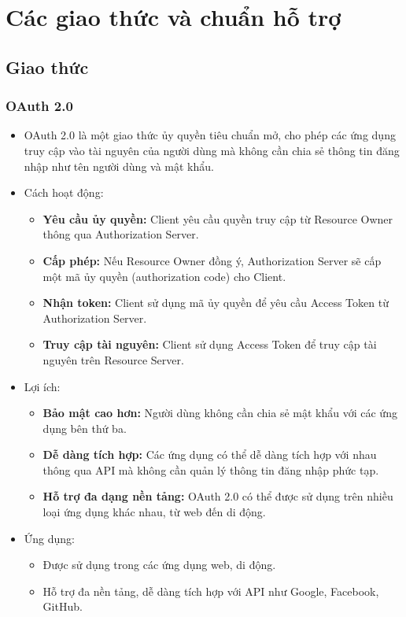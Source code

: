 \newpage
\section{Các giao thức và chuẩn hỗ trợ}
\subsection{Giao thức}
\subsubsection{OAuth 2.0}
\begin{itemize}
    \item OAuth 2.0 là một giao thức ủy quyền tiêu chuẩn mở, cho phép các ứng dụng truy cập vào tài nguyên của người dùng mà không cần chia sẻ thông tin đăng nhập như tên người dùng và mật khẩu.
    \item Cách hoạt động:
    \begin{itemize}
        \item \textbf{Yêu cầu ủy quyền:} Client yêu cầu quyền truy cập từ Resource Owner thông qua Authorization Server.
        \item \textbf{Cấp phép:} Nếu Resource Owner đồng ý, Authorization Server sẽ cấp một mã ủy quyền (authorization code) cho Client.
        \item \textbf{Nhận token:} Client sử dụng mã ủy quyền để yêu cầu Access Token từ Authorization Server.
        \item \textbf{Truy cập tài nguyên:} Client sử dụng Access Token để truy cập tài nguyên trên Resource Server.
    \end{itemize}
    \item Lợi ích:
    \begin{itemize}
        \item \textbf{Bảo mật cao hơn:} Người dùng không cần chia sẻ mật khẩu với các ứng dụng bên thứ ba.
        \item \textbf{Dễ dàng tích hợp:} Các ứng dụng có thể dễ dàng tích hợp với nhau thông qua API mà không cần quản lý thông tin đăng nhập phức tạp.
        \item \textbf{Hỗ trợ đa dạng nền tảng:} OAuth 2.0 có thể được sử dụng trên nhiều loại ứng dụng khác nhau, từ web đến di động.
    \end{itemize}
    \item Ứng dụng:
    \begin{itemize}
        \item Được sử dụng trong các ứng dụng web, di động.
        \item Hỗ trợ đa nền tảng, dễ dàng tích hợp với API như Google, Facebook, GitHub.
    \end{itemize}
\end{itemize}

